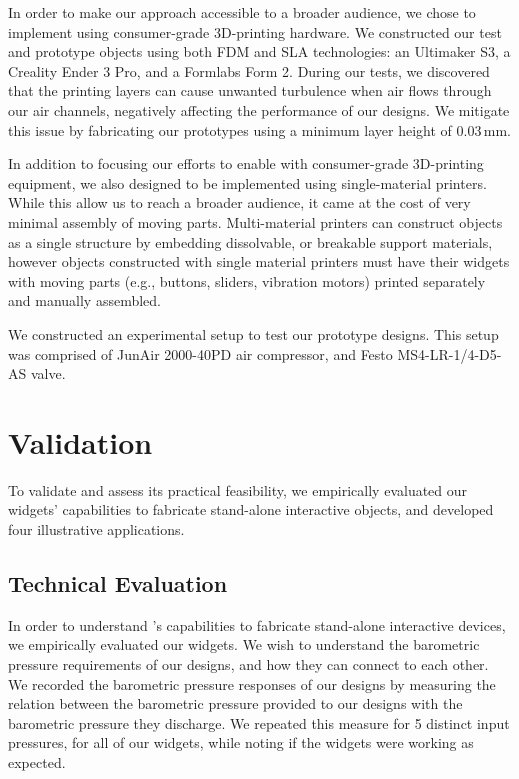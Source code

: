     In order to make our approach accessible to a broader audience, we
    chose to implement \al using consumer-grade 3D-printing hardware. We
    constructed our test and prototype objects using both FDM and SLA
    technologies: an Ultimaker S3, a Creality Ender 3 Pro, and a Formlabs
    Form 2. During our tests, we discovered that the printing layers can cause
    unwanted turbulence when air flows through our air channels, negatively
    affecting the performance of our designs. We mitigate this issue by
    fabricating our prototypes using a minimum layer height of 0.03\,mm. 

    In addition to focusing our efforts to enable \al with consumer-grade
    3D-printing equipment, we also designed \al to be implemented using
    single-material printers. While this allow us to reach a broader
    audience, it came at the cost of very minimal assembly of moving parts.
    Multi-material printers can construct \al objects as a single structure
    by embedding dissolvable, or breakable support materials, however \al
    objects constructed with single material printers must have their widgets
    with moving parts (e.g., buttons, sliders, vibration motors) printed
    separately and manually assembled.

    We constructed an experimental setup to test our \al prototype designs.
    This setup was comprised of JunAir 2000-40PD air compressor, and Festo
    MS4-LR-1/4-D5-AS valve.

  \section{Validation}
    To validate \al and assess its practical feasibility, we empirically
    evaluated our widgets' capabilities to fabricate stand-alone
    interactive objects, and developed four illustrative applications.

    \subsection{Technical Evaluation}
      In order to understand \al's capabilities to fabricate stand-alone
      interactive devices, we empirically evaluated our widgets. We wish to
      understand the barometric pressure requirements of our designs, and
      how they can connect to each other. We recorded the barometric
      pressure responses of our designs by measuring the relation between
      the barometric pressure provided to our designs with the barometric
      pressure they discharge. We repeated this measure for 5 distinct
      input pressures, for all of our widgets, while noting if the widgets
      were working as expected.
      
